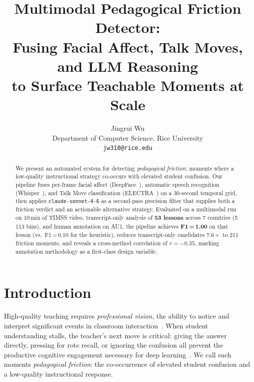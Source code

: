 \documentclass[10pt,twocolumn,letterpaper]{article}
\begin{document}
\title{Multimodal Pedagogical Friction Detector:\\
Fusing Facial Affect, Talk Moves, and LLM Reasoning\\
to Surface Teachable Moments at Scale}

\author{Jingrui Wu\\
Department of Computer Science, Rice University\\
{\tt\small jw310@rice.edu}
}

\maketitle

\begin{abstract}
We present an automated system for detecting \emph{pedagogical friction}:
moments where a low-quality instructional strategy co-occurs with elevated
student confusion.  Our pipeline fuses per-frame facial affect
(DeepFace~\cite{deepface}), automatic speech recognition
(Whisper~\cite{whisper}), and Talk Move classification
(ELECTRA~\cite{talkmovesaaai}) on a 30-second temporal grid, then
applies \texttt{claude-sonnet-4-6} as a second-pass precision filter
that supplies both a friction verdict and an actionable alternative
strategy.  Evaluated on a multimodal run on 10\,min of TIMSS video,
transcript-only analysis of \textbf{53 lessons} across 7 countries
(5\,113 bins), and human annotation on AU1, the pipeline
achieves \textbf{F1\,=\,1.00} on that lesson (vs.\ F1\,=\,0.10 for
the heuristic), reduces transcript-only candidates $7.6\times$ to
211 friction moments, and reveals a cross-method correlation of
$r{=}{-}0.35$, marking annotation methodology
as a first-class design variable.
\end{abstract}

\section{Introduction}

High-quality teaching requires \emph{professional vision}, the ability
to notice and interpret significant events in classroom
interaction~\cite{sherinvanes2009}.  When student understanding
stalls, the teacher's next move is critical: giving the answer
directly, pressing for rote recall, or ignoring the confusion all
prevent the productive cognitive engagement necessary for deep
learning~\cite{dmello2012}.  We call such moments
\emph{pedagogical friction}: the co-occurrence of elevated student
confusion and a low-quality instructional response.
\end{document}
